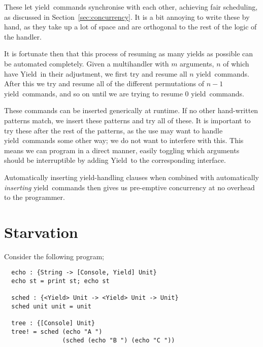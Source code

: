 \documentclass[msc,deptreport,cs]{infthesis} %
\newcommand\yield{\textsf{yield}\xspace}
\newcommand\Yield{\textsf{Yield}\xspace}
\begin{document}
These let \yield~commands synchronise with each other, achieving fair scheduling,
as discussed in Section~\ref{sec:concurrency}. It is a bit annoying to write
these by hand, as they take up a lot of space and are orthogonal to the rest of
the logic of the handler.

It is fortunate then that this process of resuming as many yields as possible
can be automated completely. Given a multihandler with $m$ arguments, $n$ of
which have \Yield~in their adjustment, we first try and resume all $n$
\yield~commands. After this we try and resume all of the different permutations
of $n-1$ \yield~commands, and so on until we are trying to resume 0
\yield~commands.
%




These commands can be inserted generically at runtime. If no other hand-written
patterns match, we insert these patterns and try all of these. It is important
to try these after the rest of the patterns, as the use may want to handle
\yield~commands some other way; we do not want to interfere with this. This
means we can program in a direct manner, easily toggling which arguments
should be interruptible by adding \Yield~to the corresponding interface.

Automatically inserting \yield-handling clauses when combined with automatically
\emph{inserting} \yield~commands then gives us pre-emptive concurrency at no
overhead to the programmer.

\section{Starvation}

Consider the following program;

\begin{lstlisting}
  echo : {String -> [Console, Yield] Unit}
  echo st = print st; echo st

  sched : {<Yield> Unit -> <Yield> Unit -> Unit}
  sched unit unit = unit

  tree : {[Console] Unit}
  tree! = sched (echo "A ")
                (sched (echo "B ") (echo "C "))
\end{lstlisting}
\end{document}
